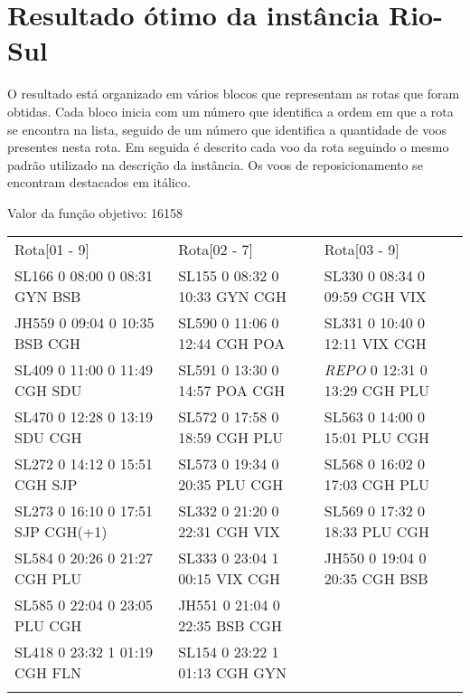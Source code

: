 \chapter{Resultado ótimo da instância Rio-Sul}\label{anx:resultriosul}

O resultado está organizado em vários blocos que representam as rotas que foram
obtidas. Cada bloco inicia com um número que identifica a ordem em que a rota se
encontra na lista, seguido de um número que identifica a quantidade de voos
presentes nesta rota. Em seguida é descrito cada voo da rota seguindo o mesmo
padrão utilizado na descrição da instância. Os voos de reposicionamento se
encontram destacados em itálico.

Valor da função objetivo: 16158

\begin{scriptsize}

\begin{longtable}{l l l}

Rota[01 - 9]  & Rota[02 - 7]  & Rota[03 - 9] \\
SL166  0 08:00 0 08:31 GYN BSB & SL155  0 08:32 0 10:33 GYN CGH & SL330  0 08:34 0 09:59 CGH VIX\\
JH559  0 09:04 0 10:35 BSB CGH & SL590  0 11:06 0 12:44 CGH POA & SL331  0 10:40 0 12:11 VIX CGH\\
SL409  0 11:00 0 11:49 CGH SDU & SL591  0 13:30 0 14:57 POA CGH & \textit{REPO}
0 12:31 0 13:29 CGH PLU\\ 
SL470  0 12:28 0 13:19 SDU CGH & SL572  0 17:58 0 18:59 CGH PLU & SL563  0 14:00 0 15:01 PLU CGH\\
SL272  0 14:12 0 15:51 CGH SJP & SL573  0 19:34 0 20:35 PLU CGH & SL568  0 16:02 0 17:03 CGH PLU\\
SL273  0 16:10 0 17:51 SJP CGH(+1) & SL332  0 21:20 0 22:31 CGH VIX & SL569  0
17:32 0 18:33 PLU CGH\\ SL584  0 20:26 0 21:27 CGH PLU & SL333  0 23:04 1 00:15 VIX CGH & JH550  0 19:04 0 20:35 CGH BSB\\
SL585  0 22:04 0 23:05 PLU CGH & JH551  0 21:04 0 22:35 BSB CGH\\
SL418  0 23:32 1 01:19 CGH FLN & SL154  0 23:22 1 01:13 CGH GYN\\

\\


\end{longtable}
\end{scriptsize}
